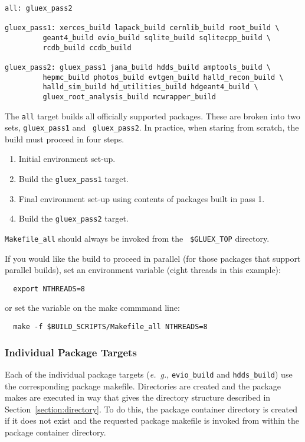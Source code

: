 \documentclass[12pt]{article}
\begin{document}
\begin{verbatim}
all: gluex_pass2

gluex_pass1: xerces_build lapack_build cernlib_build root_build \
	     geant4_build evio_build sqlite_build sqlitecpp_build \
	     rcdb_build ccdb_build

gluex_pass2: gluex_pass1 jana_build hdds_build amptools_build \
	     hepmc_build photos_build evtgen_build halld_recon_build \
	     halld_sim_build hd_utilities_build hdgeant4_build \
	     gluex_root_analysis_build mcwrapper_build
\end{verbatim}

The {\tt all} target builds all officially supported packages. These
are broken into two sets, {\tt gluex\_pass1} and {\tt
  gluex\_pass2}. In practice, when staring from scratch, the build
must proceed in four steps.

\begin{enumerate}
\item Initial environment set-up.
\item Build the {\tt gluex\_pass1} target.
\item Final environment set-up using contents of packages built in pass 1.
\item Build the {\tt gluex\_pass2} target.
\end{enumerate}

{{\tt Makefile\_all}} should always be invoked from the {\tt
  \$GLUEX\_TOP} directory.

If you would like the build to proceed in parallel (for those packages that support parallel builds), set an environment variable (eight threads in this example):
\begin{verbatim}
  export NTHREADS=8
\end{verbatim}
or set the variable on the make commmand line:
\begin{verbatim}
  make -f $BUILD_SCRIPTS/Makefile_all NTHREADS=8
\end{verbatim}
\subsubsection{Individual Package Targets}

Each of the individual package targets ({\it e.~g.}, {\tt evio\_build}
and {\tt hdds\_build}) use the corresponding package
makefile. Directories are created and the package makes are executed
in way that gives the directory structure described in
Section~\ref{section:directory}. To do this, the package container
directory is created if it does not exist and the requested package
makefile is invoked from within the package container directory.
\end{document}
